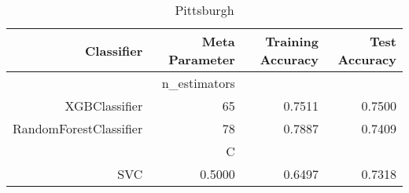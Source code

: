 
\begin{table}[H]
    \caption{Pittsburgh}
    \centering
    \begin{tabular}{|r|r|r|r|}
        \hline
        Classifier &Meta Parameter &Training Accuracy
        &Test Accuracy\\
        \hline
        &n\_estimators &\multicolumn{2}{|r|}{}\\
        \hline
        XGBClassifier &65 &0.7511 &0.7500\\
        \hline
        RandomForestClassifier &78 &0.7887 &0.7409\\
        \hline
        &C &\multicolumn{2}{|r|}{}\\
        \hline
        SVC &0.5000 &0.6497 &0.7318\\
        \hline
    \end{tabular}
\end{table}
